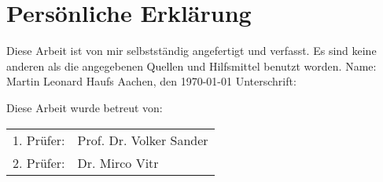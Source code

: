 \chapter*{Persönliche Erklärung}
\begin{flushleft}
Diese Arbeit ist von mir selbstständig angefertigt und verfasst. Es sind keine anderen als die angegebenen Quellen und Hilfsmittel benutzt worden.
\linebreak
\linebreak
    Name: Martin Leonard Haufs
    \linebreak 
    Aachen, den \today
    \linebreak	
    \linebreak
    Unterschrift: \underline{\hspace{5cm}}
    	
    \vspace{2.0cm}
    Diese Arbeit wurde betreut von: \linebreak
    
    \begin{tabular*}{\linewidth}{ll}
    	1. Prüfer: & Prof. Dr. Volker Sander\\
    	2. Prüfer: & Dr. Mirco Vitr
    \end{tabular*}

\end{flushleft}